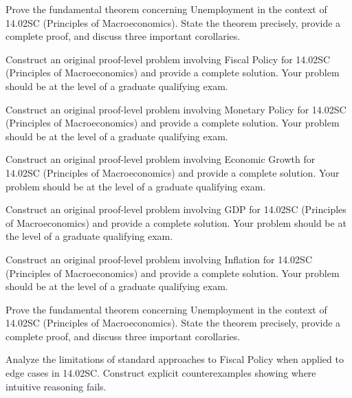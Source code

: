\documentclass[12pt,a4paper]{exam}
\begin{document}
\begin{questions}
\vspace{0.3cm}

\question[5]
Prove the fundamental theorem concerning Unemployment in the context of 14.02SC (Principles of Macroeconomics). State the theorem precisely, provide a complete proof, and discuss three important corollaries.

\vspace{0.3cm}

\question[3]
Construct an original proof-level problem involving Fiscal Policy for 14.02SC (Principles of Macroeconomics) and provide a complete solution. Your problem should be at the level of a graduate qualifying exam.

\vspace{0.3cm}

\question[2]
Construct an original proof-level problem involving Monetary Policy for 14.02SC (Principles of Macroeconomics) and provide a complete solution. Your problem should be at the level of a graduate qualifying exam.

\vspace{0.3cm}

\question[4]
Construct an original proof-level problem involving Economic Growth for 14.02SC (Principles of Macroeconomics) and provide a complete solution. Your problem should be at the level of a graduate qualifying exam.

\vspace{0.3cm}

\question[5]
Construct an original proof-level problem involving GDP for 14.02SC (Principles of Macroeconomics) and provide a complete solution. Your problem should be at the level of a graduate qualifying exam.

\vspace{0.3cm}

\question[2]
Construct an original proof-level problem involving Inflation for 14.02SC (Principles of Macroeconomics) and provide a complete solution. Your problem should be at the level of a graduate qualifying exam.

\vspace{0.3cm}

\question[3]
Prove the fundamental theorem concerning Unemployment in the context of 14.02SC (Principles of Macroeconomics). State the theorem precisely, provide a complete proof, and discuss three important corollaries.

\vspace{0.3cm}

\question[6]
Analyze the limitations of standard approaches to Fiscal Policy when applied to edge cases in 14.02SC. Construct explicit counterexamples showing where intuitive reasoning fails.


\end{questions}
\end{document}
